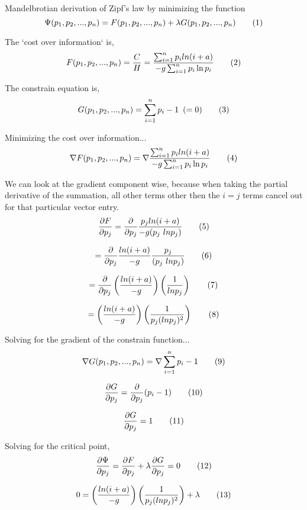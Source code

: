 Mandelbrotian derivation of Zipf's law by minimizing the function
\[
  \Psi(p_1, p_2, ..., p_n)
  =
  F(p_1, p_2, ..., p_n)
  +
  \lambda G(p_1, p_2, ..., p_n)
  \addtag
\]

The `cost over information` is,
\[
  F(p_1, p_2, ..., p_n)
  =
  \frac{C}{H}
  =
  \frac{
    \sum_{i=1}^{n}
      p_i
      ln(i + a)
  }{
    -g
    \sum_{i=1}^{n}
      p_i \ln p_i
  }
  \addtag
\]

The constrain equation is,
\[
  G(p_1, p_2, ..., p_n) =
  \sum_{i=1}^{n}
    p_i - 1
  \, \, \, (= 0)
  \addtag
\]

Minimizing the cost over information...
\[
  \nabla F(p_1, p_2, ..., p_n)
  =
  \nabla
  \frac{
    \sum_{i=1}^{n}
      p_i
      ln(i + a)
  }{
    -g
    \sum_{i=1}^{n}
      p_i \ln p_i
  }
  \addtag
\]

We can look at the gradient component wise, because when taking the partial derivative of the summation, all other terms other then the $i = j$ terms cancel out for that particular vector entry.
\[
  \frac{\partial F}{\partial p_j}
  =
  \frac{\partial}{\partial p_j}
  \frac{
      p_j
      ln(i + a)
  }{
    -g
     (p_j \ ln p_j)
  }
  \addtag
\]

\[
  =
  \frac{\partial}{\partial p_j}
  \frac{ln(i + a)}{-g}
  \frac{
      p_j
  }{
     (p_j \ ln p_j)
  }
  \addtag
\]

\[
  =
  \frac{\partial}{\partial p_j}
  \left(
    \frac{ln(i + a)}{-g}
  \right)
  \left(
    \frac{1}{ln p_j}
  \right)
  \addtag
\]

\[
  =
  \left(
    \frac{ln(i + a)}{-g}
  \right)
  \left(
    \frac{
      1
    }{
      p_j(ln p_j)^2
    }
  \right)
  \addtag
\]

Solving for the gradient of the constrain function...
\[
  \nabla G(p_1, p_2, ..., p_n) =
  \nabla
  \sum_{i=1}^{n}
    p_i - 1
  \addtag
\]

\[
  \frac{\partial G}{\partial p_j}
  =
  \frac{\partial}{\partial p_j}
  (p_i - 1)
  \addtag
\]

\[
  \frac{\partial G}{\partial p_j}
  =
  1
  \addtag
\]

Solving for the critical point,
\[
  \frac{\partial \Psi}{\partial p_j}
  =
  \frac{\partial F}{\partial p_j}
  +
  \lambda
  \frac{\partial G}{\partial p_j}
  =
  0
  \addtag
\]

\[
  0
  =
  \left(
    \frac{ln(i + a)}{-g}
  \right)
  \left(
    \frac{
      1
    }{
      p_j(ln p_j)^2
    }
  \right)
  +
  \lambda
  \addtag
\]

